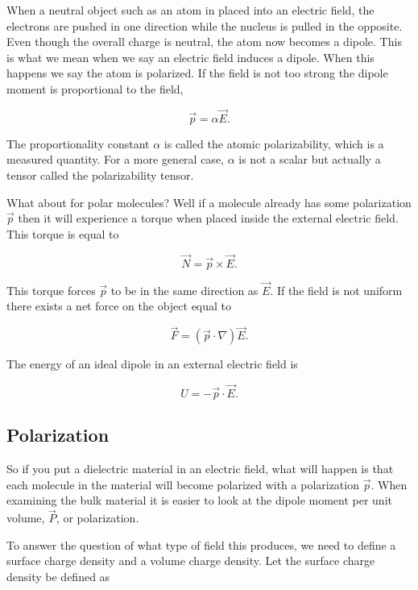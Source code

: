\documentclass[preprint, review,12pt]{elsarticle}
\begin{document}
When a neutral object such as an atom in placed into an electric field, the electrons are pushed in one direction while the nucleus is pulled in the opposite. Even though the overall charge is neutral, the atom now becomes a dipole. This is what we mean when we say an electric field induces a dipole. When this happens we say the atom is polarized. If the field is not too strong the dipole moment is proportional to the field,

\begin{equation}
    \vec{p} = \alpha \vec{E}.
\end{equation}

The proportionality constant $\alpha$ is called the atomic polarizability, which is a measured quantity. For a more general case, $\alpha$ is not a scalar but actually a tensor called the polarizability tensor.  


What about for polar molecules? Well if a molecule already has some polarization $\vec{p}$ then it will experience a torque when placed inside the external electric field. This torque is equal to 

\begin{equation}
    \vec{N} = \vec{p} \times \vec{E}.
\end{equation}

This torque forces $\vec{p}$ to be in the same direction as $\vec{E}$. If the field is not uniform there exists a net force on the object equal to 

\begin{equation}
    \vec{F} = (\vec{p} \cdot \nabla)\vec{E}.
\end{equation}

The energy of an ideal dipole in an external electric field is

\begin{equation}
    U = - \vec{p} \cdot \vec{E}.
\end{equation}

\subsection{Polarization}

So if you put a dielectric material in an electric field, what will happen is that each molecule in the material will become polarized with a polarization $\vec{p}$. When examining the bulk material it is easier to look at the dipole moment per unit volume, $\vec{P}$, or polarization.

To answer the question of what type of field this produces, we need to define a surface charge density and a volume charge density. Let the surface charge density be defined as 
\end{document}
